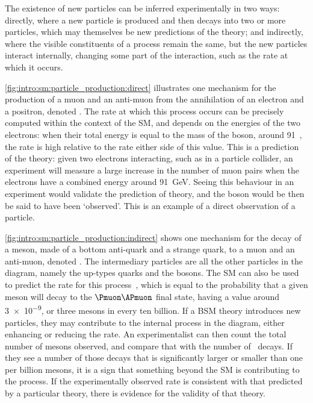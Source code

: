 The existence of new particles can be inferred experimentally in two ways: 
directly, where a new particle is produced and then decays into two or more 
particles, which may themselves be new predictions of the theory; and 
indirectly, where the visible constituents of a process remain the same, but 
the new particles interact internally, changing some part of the interaction, 
such as the rate at which it occurs.

\cref{fig:intro:sm:particle_production:direct} illustrates one mechanism for 
the production of a muon and an anti-muon from the annihilation of an electron 
and a positron, denoted \decay{\Pelectron\APelectron}{\Pmuon\APmuon}.
The rate at which this process occurs can be precisely computed within the 
context of the \ac{SM}, and depends on the energies of the two electrons: when 
their total energy is equal to the mass of the \PZ boson, around 
\SI{91}{\GeVcc}~\cite{PDG2014}, the rate is high relative to the rate either 
side of this value.
This is a prediction of the theory: given two electrons interacting, such as in 
a particle collider, an experiment will measure a large increase in the number 
of muon pairs when the electrons have a combined energy around \SI{91}{\GeV}.
Seeing this behaviour in an experiment would validate the prediction of theory, 
and the \PZ boson would be then be said to have been `observed'.
This is an example of a direct observation of a particle.

\cref{fig:intro:sm:particle_production:indirect} shows one mechanism for the 
decay of a \PBs meson, made of a bottom anti-quark and a strange quark, to a 
muon and an anti-muon, denoted \BsTomumu.
The intermediary particles are all the other particles in the diagram, namely 
the up-types quarks and the \PW bosons.
The \ac{SM} can also be used to predict the rate for this 
process~\cite{Bobeth:2013uxa}, which is equal to the probability that a given 
\PBs meson will decay to the $\Pmuon\APmuon$ final state, having a value around 
\num{3e-9}, or three \PBs mesons in every ten billion.
If a \ac{BSM} theory introduces new particles, they may contribute to the 
internal process in the diagram, either enhancing or reducing the rate.
An experimentalist can then count the total number of \PBs mesons observed, and 
compare that with the number of \BsTomumu\ decays.
If they see a number of those decays that is significantly larger or smaller 
than one per billion \PBs mesons, it is a sign that something beyond the 
\ac{SM} is contributing to the process.
If the experimentally observed rate is consistent with that predicted by a 
particular theory, there is evidence for the validity of that theory.

